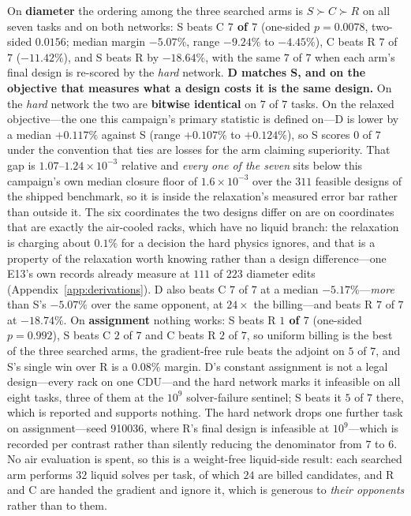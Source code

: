 \documentclass{article}
\begin{document}
On \textbf{diameter} the ordering among the three searched arms is $S \succ C \succ R$ on
all seven tasks and on both networks: S beats C \textbf{$7$ of $7$} (one-sided
$p = 0.0078$, two-sided $0.0156$; median margin $-5.07\%$, range
$-9.24\%$ to $-4.45\%$), C beats R $7$ of $7$ ($-11.42\%$), and S beats R by $-18.64\%$,
with the same $7$ of $7$ when each arm's final design is re-scored by the \emph{hard}
network.  \textbf{D matches S, and on the objective that measures what a design costs it is the
same design.}  On the \emph{hard} network the two are \textbf{bitwise identical} on
$7$ of $7$ tasks.  On the relaxed objective---the one this campaign's primary statistic is
defined on---D is lower by a median $+0.117\%$ against S (range $+0.107\%$ to $+0.124\%$),
so S scores $0$ of $7$ under the convention that ties are losses for the arm claiming
superiority.  That gap is $1.07$--$1.24\times10^{-3}$ relative and \emph{every one of the
seven} sits below this campaign's own median closure floor of $1.6\times10^{-3}$ over the
$311$ feasible designs of the shipped benchmark, so it is inside the relaxation's measured
error bar rather than outside it.  The six coordinates the two designs differ on are
on coordinates that are exactly the air-cooled racks, which have no liquid branch: the relaxation is charging
about $0.1\%$ for a decision the hard physics ignores, and that is a property of the
relaxation worth knowing rather than a design difference---one E13's own records already
measure at $111$ of $223$ diameter edits (Appendix~\ref{app:derivations}).  D also beats C $7$ of $7$ at a
median $-5.17\%$---\emph{more} than S's $-5.07\%$ over the same opponent, at $24\times$
the billing---and beats R $7$ of $7$ at $-18.74\%$.  On \textbf{assignment}
nothing works: S beats R \textbf{$1$ of $7$}
(one-sided $p = 0.992$), S beats C $2$ of $7$ and C beats R $2$ of $7$, so uniform billing
is the best of the three searched arms, the gradient-free rule beats the adjoint on
$5$ of $7$, and S's single win over R is a $0.08\%$ margin.  D's constant assignment is
not a legal design---every rack on one CDU---and the hard network marks it infeasible on
all eight tasks, three of them at the $10^9$ solver-failure sentinel; S beats it $5$ of $7$
there, which is reported and supports nothing.  The hard network drops one
further task on assignment---seed 910036, where R's final design is infeasible at
$10^9$---which is recorded per contrast rather than silently reducing the denominator from
$7$ to $6$.  No air evaluation is spent, so this is a weight-free liquid-side result:
each searched arm performs $32$ liquid solves per task, of which $24$ are billed
candidates, and R and C are handed the gradient and ignore it, which is generous to
\emph{their opponents} rather than to them.
\end{document}
